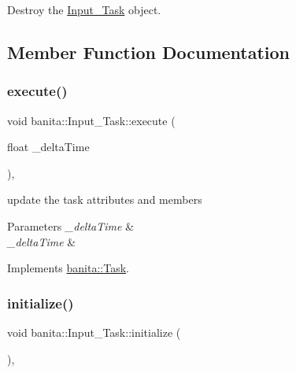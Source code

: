 Destroy the \mbox{\hyperlink{classbanita_1_1_input___task}{Input\+\_\+\+Task}} object. 



\subsection{Member Function Documentation}
\mbox{\label{classbanita_1_1_input___task_a68a88772e60109b5d461b2a75f05ee35}} 
\subsubsection{\texorpdfstring{execute()}{execute()}}
{\footnotesize\ttfamily void banita\+::\+Input\+\_\+\+Task\+::execute (\begin{DoxyParamCaption}\item[{float}]{\+\_\+delta\+Time }\end{DoxyParamCaption})\hspace{0.3cm}{\ttfamily [override]}, {\ttfamily [virtual]}}



update the task attributes and members 


\begin{DoxyParams}{Parameters}
{\em \+\_\+delta\+Time} & \\
\hline
{\em \+\_\+delta\+Time} & \\
\hline
\end{DoxyParams}


Implements \mbox{\hyperlink{classbanita_1_1_task_aa79a45c9cbfac80ec9e4f060d5d444aa}{banita\+::\+Task}}.

\mbox{\label{classbanita_1_1_input___task_a3f7f72ab848a23a92c3351426b3595c9}} 
\subsubsection{\texorpdfstring{initialize()}{initialize()}}
{\footnotesize\ttfamily void banita\+::\+Input\+\_\+\+Task\+::initialize (\begin{DoxyParamCaption}{ }\end{DoxyParamCaption})\hspace{0.3cm}{\ttfamily [override]}, {\ttfamily [virtual]}}



